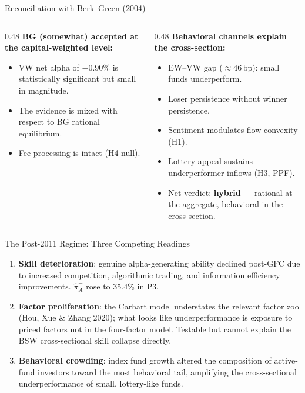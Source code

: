 \documentclass[10pt, aspectratio=169]{beamer}
\newcommand{\bp}{\,\text{bp}}
\newcommand{\pct}{\%}
\begin{document}
\begin{frame}{Reconciliation with Berk–Green (2004)}
  \begin{columns}[T]
    \begin{column}{0.48\textwidth}
      \textbf{BG (somewhat) accepted at the capital-weighted level:}
      \begin{itemize}\itemsep4pt
        \item VW net alpha of $-0.90\pct$ is statistically significant but small in magnitude.
        \item The evidence is mixed with respect to BG rational equilibrium.
        \item Fee processing is intact (H4 null).
      \end{itemize}
    \end{column}
    \begin{column}{0.48\textwidth}
      \textbf{Behavioral channels explain the cross-section:}
      \begin{itemize}\itemsep4pt
        \item EW–VW gap ($\approx 46\bp$): small funds underperform.
        \item Loser persistence without winner persistence.
        \item Sentiment modulates flow convexity (H1).
        \item Lottery appeal sustains underperformer inflows (H3, PPF).
        \item Net verdict: \textbf{hybrid} — rational at the aggregate, behavioral
              in the cross-section.
      \end{itemize}
    \end{column}
  \end{columns}
\end{frame}

\begin{frame}{The Post-2011 Regime: Three Competing Readings}
  \begin{enumerate}\itemsep8pt
    \item \textbf{Skill deterioration}: genuine alpha-generating ability declined
          post-GFC due to increased competition, algorithmic trading, and information
          efficiency improvements. $\hat{\pi}^-_A$ rose to 35.4\% in P3.
    \item \textbf{Factor proliferation}: the Carhart model understates the relevant
          factor zoo (Hou, Xue \& Zhang 2020); what looks like underperformance is
          exposure to priced factors not in the four-factor model. Testable but
          cannot explain the BSW cross-sectional skill collapse directly.
    \item \textbf{Behavioral crowding}: index fund growth altered the composition of
          active-fund investors toward the most behavioral tail, amplifying the
          cross-sectional underperformance of small, lottery-like funds.
  \end{enumerate}
\end{frame}
\end{document}
